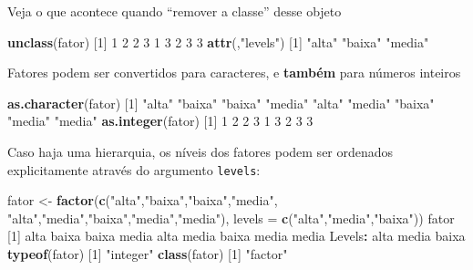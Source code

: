 \documentclass[10pt,a4paper]{book}
\newenvironment{Shaded}{\begin{snugshade}}{\end{snugshade}}
\newcommand{\KeywordTok}[1]{\textcolor[rgb]{0.13,0.29,0.53}{\textbf{#1}}}
\newcommand{\DataTypeTok}[1]{\textcolor[rgb]{0.13,0.29,0.53}{#1}}
\newcommand{\DecValTok}[1]{\textcolor[rgb]{0.00,0.00,0.81}{#1}}
\newcommand{\StringTok}[1]{\textcolor[rgb]{0.31,0.60,0.02}{#1}}
\newcommand{\OperatorTok}[1]{\textcolor[rgb]{0.81,0.36,0.00}{\textbf{#1}}}
\newcommand{\NormalTok}[1]{#1}
\begin{document}
Veja o que acontece quando ``remover a classe'' desse objeto

\begin{Shaded}
\begin{Highlighting}[]
\KeywordTok{unclass}\NormalTok{(fator)}
\NormalTok{[}\DecValTok{1}\NormalTok{] }\DecValTok{1} \DecValTok{2} \DecValTok{2} \DecValTok{3} \DecValTok{1} \DecValTok{3} \DecValTok{2} \DecValTok{3} \DecValTok{3}
\KeywordTok{attr}\NormalTok{(,}\StringTok{"levels"}\NormalTok{)}
\NormalTok{[}\DecValTok{1}\NormalTok{] }\StringTok{"alta"}  \StringTok{"baixa"} \StringTok{"media"}
\end{Highlighting}
\end{Shaded}

Fatores podem ser convertidos para caracteres, e \textbf{também} para
números inteiros

\begin{Shaded}
\begin{Highlighting}[]
\KeywordTok{as.character}\NormalTok{(fator)}
\NormalTok{[}\DecValTok{1}\NormalTok{] }\StringTok{"alta"}  \StringTok{"baixa"} \StringTok{"baixa"} \StringTok{"media"} \StringTok{"alta"}  \StringTok{"media"} \StringTok{"baixa"} \StringTok{"media"} \StringTok{"media"}
\KeywordTok{as.integer}\NormalTok{(fator)}
\NormalTok{[}\DecValTok{1}\NormalTok{] }\DecValTok{1} \DecValTok{2} \DecValTok{2} \DecValTok{3} \DecValTok{1} \DecValTok{3} \DecValTok{2} \DecValTok{3} \DecValTok{3}
\end{Highlighting}
\end{Shaded}

Caso haja uma hierarquia, os níveis dos fatores podem ser ordenados
explicitamente através do argumento \texttt{levels}:

\begin{Shaded}
\begin{Highlighting}[]
\NormalTok{fator <-}\StringTok{ }\KeywordTok{factor}\NormalTok{(}\KeywordTok{c}\NormalTok{(}\StringTok{"alta"}\NormalTok{,}\StringTok{"baixa"}\NormalTok{,}\StringTok{"baixa"}\NormalTok{,}\StringTok{"media"}\NormalTok{,}
                  \StringTok{"alta"}\NormalTok{,}\StringTok{"media"}\NormalTok{,}\StringTok{"baixa"}\NormalTok{,}\StringTok{"media"}\NormalTok{,}\StringTok{"media"}\NormalTok{),}
                \DataTypeTok{levels =} \KeywordTok{c}\NormalTok{(}\StringTok{"alta"}\NormalTok{,}\StringTok{"media"}\NormalTok{,}\StringTok{"baixa"}\NormalTok{))}
\NormalTok{fator}
\NormalTok{[}\DecValTok{1}\NormalTok{] alta  baixa baixa media alta  media baixa media media}
\NormalTok{Levels}\OperatorTok{:}\StringTok{ }\NormalTok{alta media baixa}
\KeywordTok{typeof}\NormalTok{(fator)}
\NormalTok{[}\DecValTok{1}\NormalTok{] }\StringTok{"integer"}
\KeywordTok{class}\NormalTok{(fator)}
\NormalTok{[}\DecValTok{1}\NormalTok{] }\StringTok{"factor"}
\end{Highlighting}
\end{Shaded}
\end{document}
